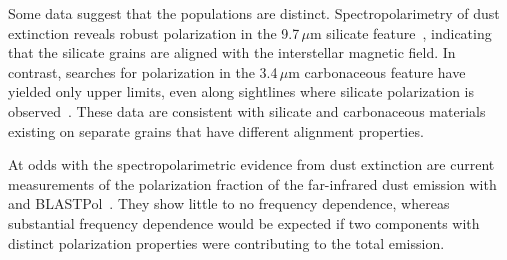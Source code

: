 \documentclass[PICOReport.tex]{subfiles}
\begin{document}

Some data suggest that the populations are distinct. Spectropolarimetry of dust extinction reveals robust polarization in the 9.7\,$\mu$m silicate feature~\citep[e.g.,][]{Smith2000}, indicating that the silicate grains are aligned with the interstellar magnetic field. In contrast, searches for polarization in the 3.4\,$\mu$m carbonaceous feature have yielded only upper limits, even along sightlines where silicate polarization is observed~\citep{Chiar2006,Mason2007}. These data are consistent with silicate and carbonaceous materials existing on separate grains that have different alignment properties. 

At odds with the spectropolarimetric evidence from dust extinction are current measurements of the polarization fraction of the far-infrared dust emission with \planck~\citep{Planck_Int_XXII} and BLASTPol~\citep{Ashton2018}. They show little to no frequency dependence, whereas substantial frequency dependence would be expected if two components with distinct polarization properties were contributing to the total emission. 
\end{document}
